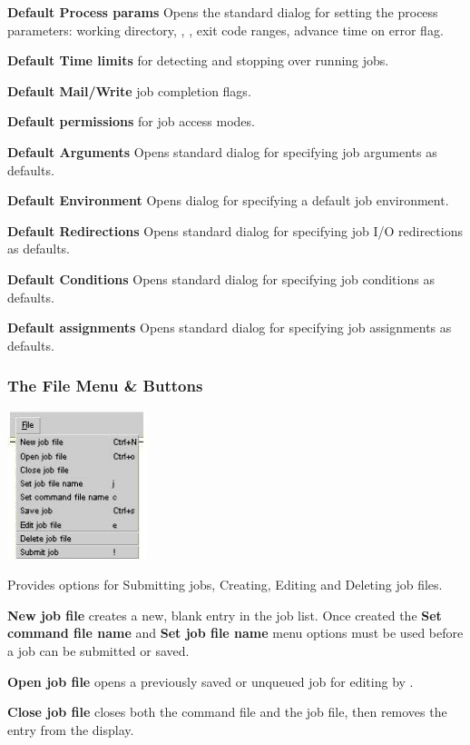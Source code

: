 \textbf{Default Process params} Opens the standard dialog for setting the process parameters: working directory,
, , exit code ranges, advance time on error flag.

\textbf{Default Time limits} for detecting and stopping over running jobs.

\textbf{Default Mail/Write} job completion flags.

\textbf{Default permissions} for job access modes.

\textbf{Default Arguments} Opens standard dialog for specifying job arguments as defaults.

\textbf{Default Environment} Opens dialog for specifying a default job environment.

\textbf{Default Redirections} Opens standard dialog for specifying job I/O redirections as defaults.

\textbf{Default Conditions} Opens standard dialog for specifying job conditions as defaults.

\textbf{Default assignments} Opens standard dialog for specifying job assignments as defaults.

\subsubsection{The File Menu \& Buttons}
 \includegraphics[width=4.082cm,height=4.313cm]{img/ref42.jpg}

Provides options for Submitting jobs, Creating, Editing and Deleting job files.

\textbf{New job file} creates a new, blank entry in the \XmbtrName{} job list. Once created the \textbf{Set command file name}
and \textbf{Set job file name} menu options must be used before a job can be submitted or saved.

\textbf{Open job file} opens a previously saved or unqueued job for editing by \PrXmbtr{}.

\textbf{Close job file} closes both the command file and the job file, then removes the entry from the \PrXmbtr{} display.

